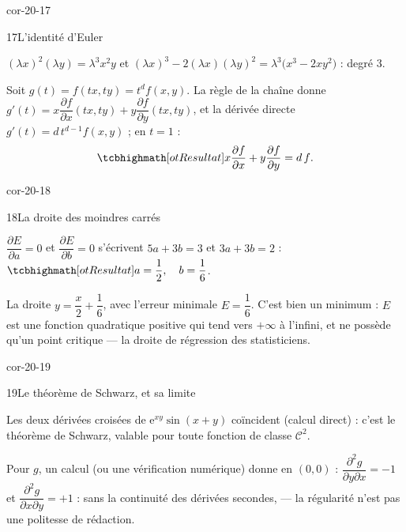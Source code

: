 \begin{blocLivre}{cor-20-17}
\begin{corrige}{17}{L'identité d'Euler}
\begin{questions}
  \item $(\lambda x)^{2}(\lambda y)=\lambda^{3}x^{2}y$ et
    $(\lambda x)^{3}-2(\lambda x)(\lambda y)^{2}
    =\lambda^{3}\bigl(x^{3}-2xy^{2}\bigr)$ : degré $3$.
  \item Soit $g(t)=f(tx,ty)=t^{d}f(x,y)$. La règle de la chaîne donne
    $g'(t)=x\dfrac{\partial f}{\partial x}(tx,ty)
    +y\dfrac{\partial f}{\partial y}(tx,ty)$, et la dérivée directe
    $g'(t)=d\,t^{d-1}f(x,y)$ ; en $t=1$ :
    \[
    \res{x\frac{\partial f}{\partial x}+y\frac{\partial f}{\partial y}
    =d\,f} .
    \]
\end{questions}
\end{corrige}
\end{blocLivre}

\begin{blocLivre}{cor-20-18}
\begin{corrige}{18}{La droite des moindres carrés}
\begin{questions}
  \item $\dfrac{\partial E}{\partial a}=0$ et
    $\dfrac{\partial E}{\partial b}=0$ s'écrivent
    $5a+3b=3$ et $3a+3b=2$ :
    $\res{a=\dfrac12,\quad b=\dfrac16}$.
  \item La droite $y=\dfrac x2+\dfrac16$, avec l'erreur minimale
    $E=\dfrac16$. C'est bien un minimum : $E$ est une fonction
    quadratique positive qui tend vers $+\infty$ à l'infini, et ne
    possède qu'un point critique — la droite de régression des
    statisticiens.
\end{questions}
\end{corrige}
\end{blocLivre}

\begin{blocLivre}{cor-20-19}
\begin{corrige}{19}{Le théorème de Schwarz, et sa limite}
\begin{questions}
  \item Les deux dérivées croisées de
    $\mathrm{e}^{xy}\sin(x+y)$ coïncident (calcul direct) : c'est le
    théorème de Schwarz, valable pour toute fonction de classe
    $\mathcal{C}^{2}$.
  \item Pour $g$, un calcul (ou une vérification numérique) donne en
    $(0,0)$ :
    $\dfrac{\partial^{2}g}{\partial y\partial x}=-1$ et
    $\dfrac{\partial^{2}g}{\partial x\partial y}=+1$ : sans la
    continuité des dérivées secondes,  — la régularité n'est pas une politesse de rédaction.
\end{questions}
\end{corrige}
\end{blocLivre}

